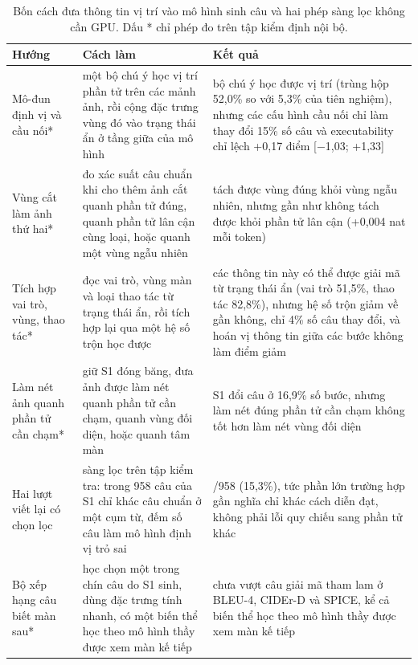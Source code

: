 \begin{table}[htbp]
\centering\small
\caption[Bốn cách đưa thông tin vị trí vào mô hình sinh câu và hai phép sàng lọc không cần GPU.]{Bốn cách đưa thông tin vị trí vào mô hình sinh câu và hai phép sàng lọc không cần GPU. Dấu * chỉ phép đo trên tập kiểm định nội bộ.}\label{tab:A.14}
\setlength{\tabcolsep}{4pt}
\begin{tabularx}{\textwidth}{@{}>{\raggedright\arraybackslash\hsize=0.32\hsize}X>{\raggedright\arraybackslash\hsize=1.17\hsize}X>{\raggedright\arraybackslash\hsize=1.51\hsize}X@{}}
\toprule
\textbf{Hướng} & \textbf{Cách làm} & \textbf{Kết quả} \\
\midrule
Mô-đun định vị và cầu nối* & một bộ chú ý học vị trí phần tử trên các mảnh ảnh, rồi cộng đặc trưng vùng đó vào trạng thái ẩn ở tầng giữa của mô hình & bộ chú ý học được vị trí (trùng hộp 52,0\% so với 5,3\% của tiên nghiệm), nhưng các cấu hình cầu nối chỉ làm thay đổi 15\% số câu và executability chỉ lệch +0,17 điểm [$-$1,03; +1,33] \\
Vùng cắt làm ảnh thứ hai* & đo xác suất câu chuẩn khi cho thêm ảnh cắt quanh phần tử đúng, quanh phần tử lân cận cùng loại, hoặc quanh một vùng ngẫu nhiên & tách được vùng đúng khỏi vùng ngẫu nhiên, nhưng gần như không tách được khỏi phần tử lân cận (+0,004 nat mỗi token) \\
Tích hợp vai trò, vùng, thao tác* & đọc vai trò, vùng màn và loại thao tác từ trạng thái ẩn, rồi tích hợp lại qua một hệ số trộn học được & các thông tin này có thể được giải mã từ trạng thái ẩn (vai trò 51,5\%, thao tác 82,8\%), nhưng hệ số trộn giảm về gần không, chỉ 4\% số câu thay đổi, và hoán vị thông tin giữa các bước không làm điểm giảm \\
Làm nét ảnh quanh phần tử cần chạm* & giữ S1 đóng băng, đưa ảnh được làm nét quanh phần tử cần chạm, quanh vùng đối diện, hoặc quanh tâm màn & S1 đổi câu ở 16,9\% số bước, nhưng làm nét đúng phần tử cần chạm không tốt hơn làm nét vùng đối diện \\
Hai lượt viết lại có chọn lọc & sàng lọc trên tập kiểm tra: trong 958 câu của S1 chỉ khác câu chuẩn ở một cụm từ, đếm số câu làm mô hình định vị trỏ sai & 147/958 (15,3\%), tức phần lớn trường hợp gần nghĩa chỉ khác cách diễn đạt, không phải lỗi quy chiếu sang phần tử khác \\
Bộ xếp hạng câu biết màn sau* & học chọn một trong chín câu do S1 sinh, dùng đặc trưng tính nhanh, có một biến thể học theo mô hình thầy được xem màn kế tiếp & chưa vượt câu giải mã tham lam ở BLEU-4, CIDEr-D và SPICE, kể cả biến thể học theo mô hình thầy được xem màn kế tiếp \\
\bottomrule
\end{tabularx}
\end{table}

